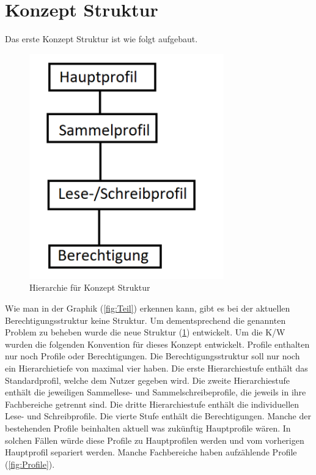 \section{Konzept Struktur}
\label{sec:chapter04:Struktur}
Das erste Konzept Struktur ist wie folgt aufgebaut.
\begin{figure}[h!]
 \centering
 \includegraphics[width=0.75\textwidth]{gfx/Picture/Hierarchie.PNG}
 \caption{Hierarchie für Konzept Struktur}
 \label{fig:Struktur}
\end{figure}
Wie man in der Graphik (\ref{fig:Teil}) erkennen kann, gibt es bei der aktuellen Berechtigungsstruktur keine Struktur.
Um dementsprechend die genannten Problem zu beheben wurde die neue Struktur (\ref{fig:Struktur}) entwickelt.
Um die \ac{K/W} wurden die folgenden Konvention für dieses Konzept entwickelt.
Profile enthalten nur noch Profile oder Berechtigungen.
Die Berechtigungsstruktur soll nur noch ein Hierarchietiefe von maximal vier haben.
Die erste Hierarchiestufe enthält das Standardprofil, welche dem Nutzer gegeben wird.
Die zweite Hierarchiestufe enthält die jeweiligen Sammellese- und Sammelschreibeprofile, die jeweils in ihre Fachbereiche getrennt sind.
Die dritte Hierarchiestufe enthält die individuellen Lese- und Schreibprofile.
Die vierte Stufe enthält die Berechtigungen.
Manche der bestehenden Profile beinhalten aktuell was zukünftig Hauptprofile wären.
In solchen Fällen würde diese Profile zu Hauptprofilen werden und vom vorherigen Hauptprofil separiert werden.
Manche Fachbereiche haben aufzählende Profile (\ref{fig:Profile}).
